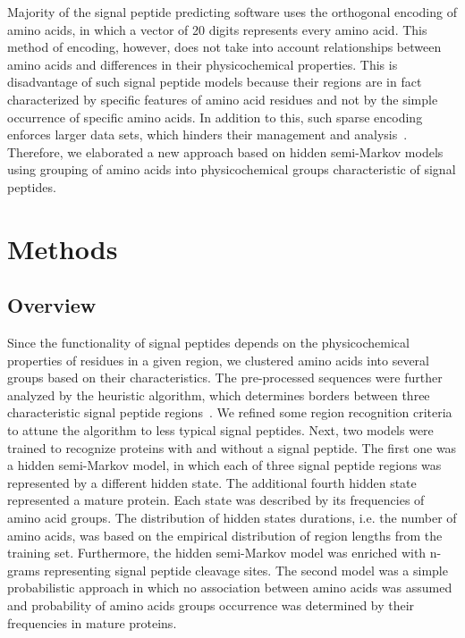 \documentclass[10pt,letterpaper]{article}
\begin{document}
Majority of the signal peptide predicting software uses the orthogonal encoding of amino acids, in which a vector of 20 digits represents every amino acid. This method of encoding, however, does not take into account relationships between amino acids and differences in their physicochemical properties. This is disadvantage of such signal peptide models because their regions are in fact characterized by specific features of amino acid residues and not by the simple occurrence of specific amino acids. In addition to this, such sparse encoding enforces larger data sets, which hinders their management and analysis~\cite{2002linamino}. Therefore, we elaborated a new approach based on hidden semi-Markov models using grouping of amino acids into physicochemical groups characteristic of signal peptides. %

\section*{Methods}

\subsection*{Overview}

Since the functionality of signal peptides depends on the physicochemical properties of residues in a given region, we clustered amino acids into several groups based on their characteristics. The pre-processed sequences were further analyzed by the heuristic algorithm, which determines borders between three characteristic signal peptide regions~\cite{1998nielsenprediction}. We refined some region recognition criteria to attune the algorithm to less typical signal peptides. Next, two models were trained to recognize proteins with and without a signal peptide. The first one was a hidden semi-Markov model, in which each of three signal peptide regions was represented by a different hidden state. The additional fourth hidden state represented a mature protein. Each state was described by its frequencies of amino acid groups. The distribution of hidden states durations, i.e. the number of amino acids, was based on the empirical distribution of region lengths from the training set. Furthermore, the hidden semi-Markov model was enriched with n-grams representing signal peptide cleavage sites. The second model was a simple probabilistic approach in which no association between amino acids was assumed and probability of amino acids groups occurrence was determined by their frequencies in mature proteins.
\end{document}
